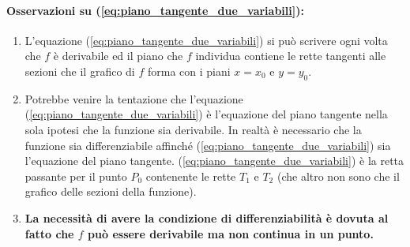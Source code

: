 \paragraph{Osservazioni su (\ref{eq:piano_tangente_due_variabili}):} 
\begin{enumerate}
	\item L'equazione (\ref{eq:piano_tangente_due_variabili}) si può scrivere ogni volta che $f$ è derivabile ed il piano che $f$ individua contiene le rette tangenti alle sezioni che il grafico di $f$ forma con i piani $x=x_0$ e $y=y_0$.
	\item Potrebbe venire la tentazione che l'equazione (\ref{eq:piano_tangente_due_variabili}) è l'equazione del piano tangente nella sola ipotesi che la funzione sia derivabile. In realtà è necessario che la funzione sia differenziabile affinché (\ref{eq:piano_tangente_due_variabili}) sia l'equazione del piano tangente.
	(\ref{eq:piano_tangente_due_variabili}) è la retta passante per il punto $P_0$ contenente le rette $T_1$ e $T_2$ (che altro non sono che il grafico delle sezioni della funzione).
	\item \textbf{La necessità di avere la condizione di differenziabilità è dovuta al fatto che $f$ può essere derivabile ma non continua in un punto.}
\end{enumerate}

